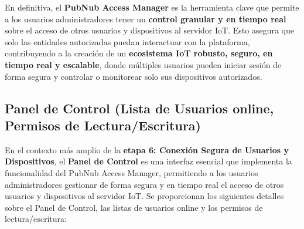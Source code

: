 \documentclass{report}
\begin{document}
En definitiva, el \textbf{PubNub Access Manager} es la herramienta clave que permite a los usuarios administradores tener un \textbf{control granular 
y en tiempo real} sobre el acceso de otros usuarios y dispositivos al servidor IoT. Esto asegura que solo las entidades autorizadas puedan interactuar 
con la plataforma, contribuyendo a la creación de un \textbf{ecosistema IoT robusto, seguro, en tiempo real y escalable}, donde múltiples usuarios 
pueden iniciar sesión de forma segura y controlar o monitorear solo sus dispositivos autorizados.

\subsection{Panel de Control (Lista de Usuarios online, Permisos de Lectura/Escritura)}
En el contexto más amplio de la \textbf{etapa 6: Conexión Segura de Usuarios y Dispositivos}, el \textbf{Panel de Control} es una interfaz esencial 
que implementa la funcionalidad del PubNub Access Manager, permitiendo a los usuarios administradores gestionar de forma segura y en tiempo real el 
acceso de otros usuarios y dispositivos al servidor IoT. Se proporcionan los siguientes detalles sobre el Panel de Control, las listas de 
usuarios online y los permisos de lectura/escritura:
\end{document}
